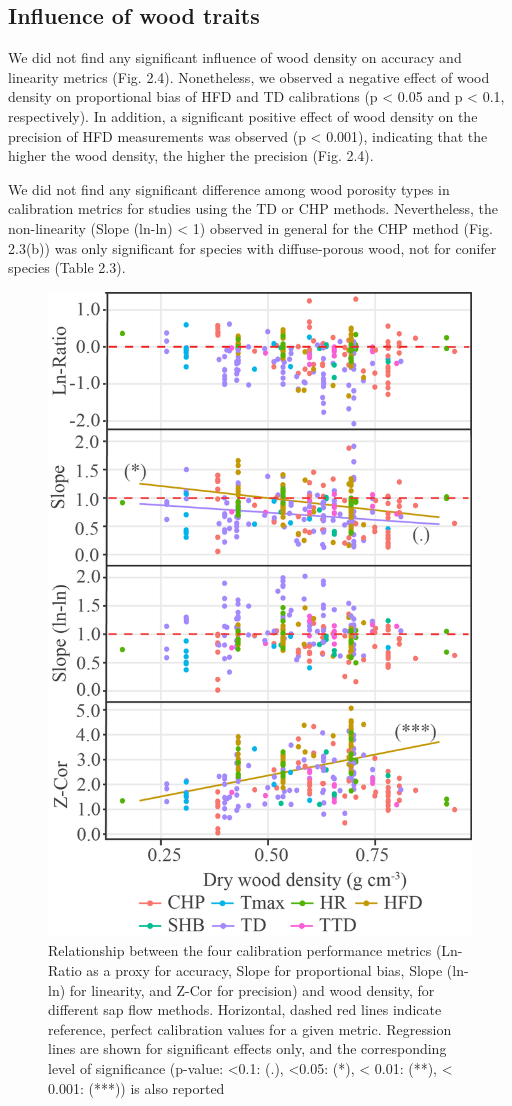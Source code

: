 \documentclass[11pt,twoside]{reedthesis}
\begin{document}
\subsection{Influence of wood traits}\label{influence-of-wood-traits}

We did not find any significant influence of wood density on accuracy
and linearity metrics (Fig. 2.4). Nonetheless, we observed a negative
effect of wood density on proportional bias of HFD and TD calibrations
(p \textless{} 0.05 and p \textless{} 0.1, respectively). In addition, a
significant positive effect of wood density on the precision of HFD
measurements was observed (p \textless{} 0.001), indicating that the
higher the wood density, the higher the precision (Fig. 2.4).\par

We did not find any significant difference among wood porosity types in
calibration metrics for studies using the TD or CHP methods.
Nevertheless, the non-linearity (Slope (ln-ln) \textless{} 1) observed
in general for the CHP method (Fig. 2.3(b)) was only significant for
species with diffuse-porous wood, not for conifer species (Table
2.3).\par
\begin{figure}[hbt!]

{\centering \includegraphics[width=0.55\linewidth]{figure/CH2/DENSITY} 

}

\caption[Relationship between the four calibration performance and wood density, for different sap flow methods.]{Relationship between the four calibration performance metrics (Ln-Ratio as a proxy for accuracy, Slope for proportional bias, Slope (ln-ln) for linearity, and Z-Cor for precision) and wood density, for different sap flow methods. Horizontal, dashed red lines indicate reference, perfect calibration values for a given metric. Regression lines are shown for significant effects only, and the corresponding level of significance (p-value: <0.1: (.), <0.05: (*), < 0.01: (**), < 0.001: (***)) is also reported }\label{fig:ch2fig4}
\end{figure}
\end{document}

